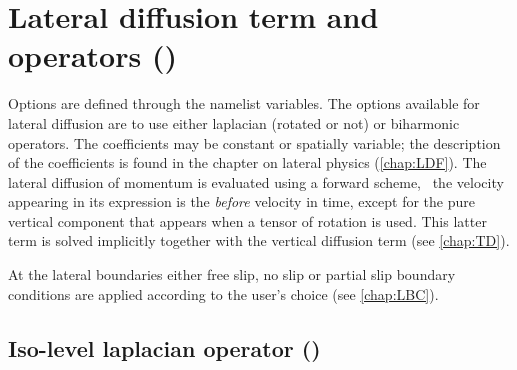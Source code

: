 \documentclass[../main/NEMO_manual]{subfiles}
\begin{document}
\section[Lateral diffusion term and operators (\textit{dynldf.F90})]{Lateral diffusion term and operators (\protect{})}
\label{sec:DYN_ldf}

\begin{listing}
  \caption{}
  \label{lst:namdyn_ldf}
\end{listing}

Options are defined through the  namelist variables.
The options available for lateral diffusion are to use either laplacian (rotated or not) or biharmonic operators.
The coefficients may be constant or spatially variable;
the description of the coefficients is found in the chapter on lateral physics (\autoref{chap:LDF}).
The lateral diffusion of momentum is evaluated using a forward scheme,
\ie\ the velocity appearing in its expression is the \textit{before} velocity in time,
except for the pure vertical component that appears when a tensor of rotation is used.
This latter term is solved implicitly together with the vertical diffusion term (see \autoref{chap:TD}).

At the lateral boundaries either free slip,
no slip or partial slip boundary conditions are applied according to the user's choice (see \autoref{chap:LBC}).


\subsection[Iso-level laplacian (\forcode{ln_dynldf_lap})]{Iso-level laplacian operator (\protect{})}
\label{subsec:DYN_ldf_lap}
\end{document}
